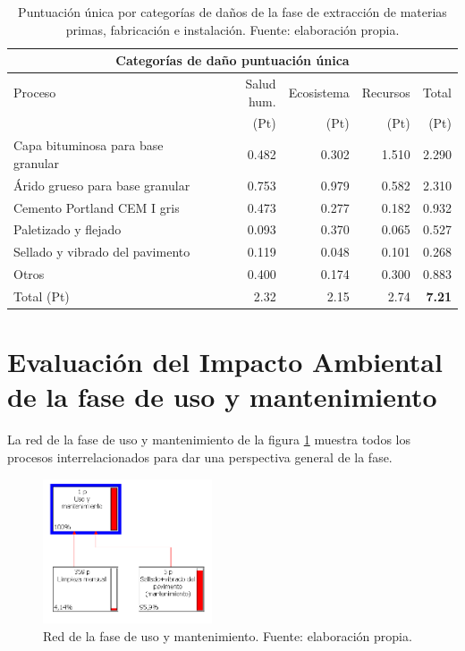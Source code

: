 \begin{table}[!htb]
\centering
\begin{tabular}{p{6cm}rrrr}
\toprule
\multicolumn{5}{c}{Categorías de daño puntuación única}\\
\midrule
Proceso & Salud hum. & Ecosistema & Recursos & Total\\
 & (Pt) & (Pt) &  (Pt) & (Pt)\\
\midrule
Capa bituminosa para base granular & 0.482 & 0.302 & 1.510 & 2.290\\
Árido grueso para base granular & 0.753 & 0.979 & 0.582 & 2.310\\
Cemento Portland CEM I gris & 0.473 & 0.277 & 0.182 & 0.932\\
Paletizado y flejado & 0.093 & 0.370 & 0.065 & 0.527\\
Sellado y vibrado del pavimento & 0.119 & 0.048 & 0.101 & 0.268\\
Otros & 0.400 & 0.174 & 0.300 & 0.883\\
\midrule
Total (Pt) & 2.32 & 2.15 & 2.74 & \textbf{7.21}\\
\bottomrule
\end{tabular}
\caption[Puntuación única por categorías de daños de la fase de extracción de materias primas, fabricación e instalación.]{Puntuación única por categorías de daños de la fase de extracción de materias primas, fabricación e instalación. Fuente: elaboración propia.}
\label{categoriasdanosfabricacion}
\end{table}

\section{Evaluación del Impacto Ambiental de la fase de uso y mantenimiento}

La red de la fase de uso y mantenimiento de la figura \ref{fig:uso_red} muestra todos los procesos interrelacionados para dar una perspectiva general de la fase.

\begin{figure}[!htb]
\centering
\includegraphics[width=5cm]{img/uso_red.png}
\caption[Red de la fase de uso y mantenimiento.]{Red de la fase de uso y mantenimiento. Fuente: elaboración propia.}
\label{fig:uso_red}
\end{figure}

